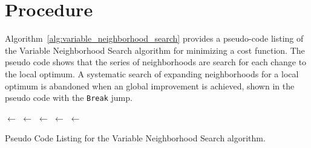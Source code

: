 \documentclass[a4paper, 11pt]{article}
\begin{document}
\section{Procedure}
\label{sec:procedure}
Algorithm~\ref{alg:variable_neighborhood_search} provides a pseudo-code listing of the Variable Neighborhood Search algorithm for minimizing a cost function.
The pseudo code shows that the series of neighborhoods are search for each change to the local optimum. A systematic search of expanding neighborhoods for a local optimum is abandoned when an global improvement is achieved, shown in the pseudo code with the \texttt{Break} jump.

\begin{algorithm}[ht]
	\SetLine

	\KwIn{\Neighborhoods}
	\KwOut{\Best}
	\Best $\leftarrow$ \RandomSolution{}\;
	\While{$\neg$ \StopCondition{}} {
		\ForEach{\CurrentNeighborhood $\in$ \Neighborhoods} {
			\Neighborhood $\leftarrow$ \CalculateNeighborhood{\Best, \CurrentNeighborhood}\;
			\Candidate $\leftarrow$ \RandomSolutionInNeighborhood{\Neighborhood}\;
			\Candidate $\leftarrow$ \LocalSearch{\Candidate}\;
			\If{\Cost{\Candidate} $<$ \Cost{\Best}} {
				\Best $\leftarrow$ \Candidate\;
				\Break\;
			}
		}
	}
	\Return{\Best}\;
	\caption{Pseudo Code Listing for the Variable Neighborhood Search algorithm.}
	\label{alg:variable_neighborhood_search}
\end{algorithm}

\end{document}
